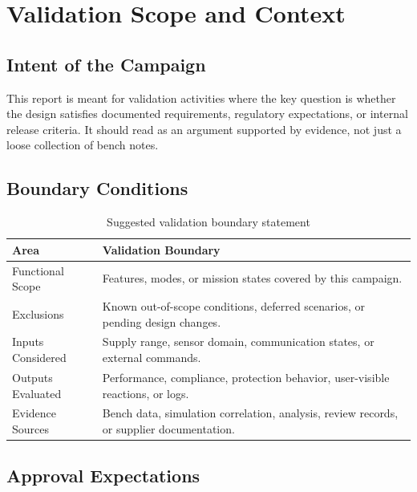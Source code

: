 \section{Validation Scope and Context}

\subsection{Intent of the Campaign}
This report is meant for validation activities where the key question is whether
the design satisfies documented requirements, regulatory expectations, or
internal release criteria. It should read as an argument supported by evidence,
not just a loose collection of bench notes.


\subsection{Boundary Conditions}
\begin{table}[H]
    \centering
    \small
    \begin{tabular}{l p{9.5cm}}
        \toprule
        \textbf{Area} & \textbf{Validation Boundary} \\
        \midrule
        Functional Scope & Features, modes, or mission states covered by this campaign. \\
        Exclusions & Known out-of-scope conditions, deferred scenarios, or pending design changes. \\
        Inputs Considered & Supply range, sensor domain, communication states, or external commands. \\
        Outputs Evaluated & Performance, compliance, protection behavior, user-visible reactions, or logs. \\
        Evidence Sources & Bench data, simulation correlation, analysis, review records, or supplier documentation. \\
        \bottomrule
    \end{tabular}
    \caption{Suggested validation boundary statement}
    \label{tab:validation-boundary}
\end{table}

\subsection{Approval Expectations}
